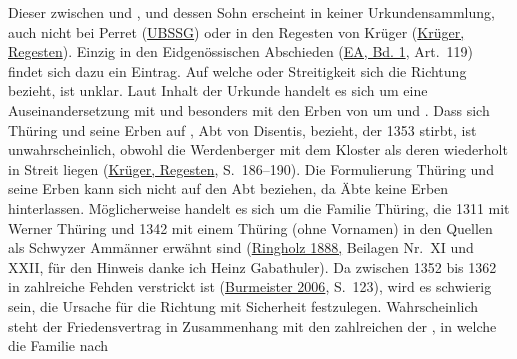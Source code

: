 \documentclass[10pt,twoside]{article}
\begin{document}
\begin{introlist}

         \item {
            Dieser  zwischen  und ,  und dessen Sohn  erscheint in keiner
               Urkundensammlung, auch nicht bei Perret (\href{http://permalink.snl.ch/bib/chbsg000110415}{UBSSG}) oder in
               den Regesten von Krüger (\href{http://permalink.snl.ch/bib/chbsg000141369}{Krüger,
                  Regesten}). Einzig in den Eidgenössischen Abschieden (\href{http://digital.ub.uni-duesseldorf.de/periodical/pageview/205767?query=Werdenberg}{EA, Bd. 1}, Art. 119) findet sich dazu ein Eintrag. Auf welche  oder Streitigkeit sich die Richtung bezieht, ist
               unklar. Laut Inhalt der Urkunde handelt es sich um eine Auseinandersetzung mit
                   und besonders mit den Erben von
                   um  und . Dass sich
               Thüring und seine Erben auf , Abt von Disentis, bezieht, der 1353 stirbt, ist unwahrscheinlich, obwohl die Werdenberger mit dem Kloster
                   als deren  wiederholt in Streit liegen (\href{http://permalink.snl.ch/bib/chbsg000141369}{Krüger, Regesten},
                  S. 186–190). Die Formulierung Thüring und seine Erben kann sich nicht auf
               den Abt beziehen, da Äbte keine Erben hinterlassen. Möglicherweise handelt es sich um
               die Familie Thüring, die 1311 mit Werner Thüring und 1342 mit einem Thüring (ohne
               Vornamen) in den Quellen als Schwyzer Ammänner erwähnt sind (\href{https://www.e-periodica.ch/digbib/view?pid=gfr-001:1888:43\#158}{Ringholz 1888,} Beilagen Nr.~XI und XXII, für den Hinweis danke
               ich Heinz Gabathuler). Da  zwischen
                  1352 bis 1362 in zahlreiche
               Fehden verstrickt ist (\href{http://permalink.snl.ch/bib/chbsg000150287}{Burmeister 2006}, S. 123), wird es schwierig sein, die Ursache für
               die Richtung mit Sicherheit festzulegen. Wahrscheinlich steht der Friedensvertrag in
               Zusammenhang mit den zahlreichen  der , in welche die Familie nach
}
\end{introlist}
\end{document}
